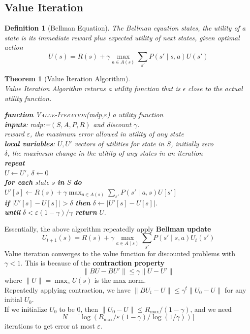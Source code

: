 \documentclass[12pt]{article}
\newcommand{\ind}{\hspace*{15pt}}
\newtheorem{definition}{Definition}[section]
\newtheorem{theorem}{Theorem}[section]
\theoremstyle{definition}
\begin{document}
\subsection{Value Iteration}
\begin{definition}[Bellman Equation]
The Bellman equation states, the utility of a state is its immediate reward plus expected utility of next states, given optimal action
\[
U(s)=R(s)+\gamma\max_{a\in A(s)}\sum_{s'}P(s'\mid s,a)U(s')
\]
\end{definition}
\begin{theorem}[Value Iteration Algorithm]
\hfill\\\normalfont Value Iteration Algorithm returns a utility function that is $\epsilon$ close to the actual utility function.

\textbf{function} \textsc{Value-Iteration}(\textit{mdp},$\varepsilon$)  a utility function\\
\ind\textbf{inputs}: \textit{mdp}:=$(S,A,P,R)$ and discount $\gamma$.\\
\ind\ind reward $\varepsilon$, the maximum error allowed in utility of any state\\
\ind\textbf{local variables}: $U,U'$ vectors of utilities for state in $S$, initially zero\\
\ind\ind $\delta$, the maximum change in the utility of any states in an iteration\\
\ind\textbf{repeat}\\
\ind\ind $U\leftarrow U'$, $\delta\leftarrow 0$\\
\ind\ind \textbf{for each} state $s$ \textbf{in} $S$ \textbf{do}\\
\ind\ind\ind $U'[s]\leftarrow R(s)+\gamma\max_{a\in A(s)}\sum_{s'}P(s'\mid a,s) U[s']$\\
\ind\ind\ind\textbf{if} $|U'[s]-U[s]|>\delta$ \textbf{then} $\delta\leftarrow |U'[s]-U[s]|$.\\
\ind\textbf{until} $\delta<\varepsilon(1-\gamma)/\gamma$
\ind\textbf{return} $U$.
\end{theorem}
Essentially, the above algorithm repeatedly apply \textbf{Bellman update}
\[
U_{t+1}(s)=R(s)+\gamma\max_{a\in A(s)}\sum_{s'}P(s'\mid s,a)U_t(s')
\]
Value iteration converges to the value function for discounted problems with $\gamma<1$. This is because of the \textbf{contraction property} 
\[
\|BU-BU'\|\leq \gamma\|U-U'\|
\]
where $\|U\|=\max_s U(s)$ is the max norm.\\
Repeatedly applying contraction, we have $\|BU_t -U\|\leq \gamma^t \|U_0-U\|$ for any initial $U_0$. \\
If we initialize $U_0$ to be $0$, then $\|U_0-U\|\leq R_{\max}/(1-\gamma)$, and we need
\[
N=\lceil \log(R_{\max} /\varepsilon(1-\gamma)/\log (1/\gamma))\rceil
\]
iterations to get error at most $\varepsilon$.
\end{document}
